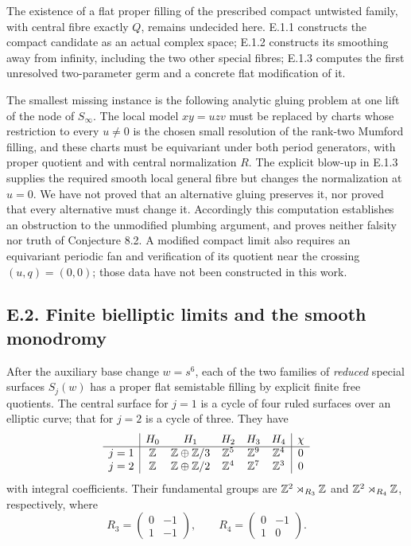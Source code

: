 \begin{problem}\label{st:E.1.5}
The existence of a flat proper filling of the prescribed compact
untwisted family, with central fibre exactly $Q$, remains undecided
here. E.1.1 constructs the compact candidate as an actual complex
space; E.1.2 constructs its smoothing away from infinity, including
the two other special fibres; E.1.3 computes the first unresolved
two-parameter germ and a concrete flat modification of it.

The smallest missing instance is the following analytic gluing
problem at one lift of the node of $S_\infty$. The local model
$xy=uzv$ must be replaced by charts whose restriction to every
$u\ne0$ is the chosen small resolution of the rank-two Mumford
filling, and these charts must be equivariant under both period
generators, with proper quotient and with central normalization $R$.
The explicit blow-up in E.1.3 supplies the required smooth local
general fibre but changes the normalization at $u=0$. We have not
proved that an alternative gluing preserves it, nor proved that every
alternative must change it. Accordingly this computation establishes
an obstruction to the unmodified plumbing argument, and proves
neither falsity nor truth of Conjecture 8.2. A modified compact limit
also requires an equivariant periodic fan and verification of its
quotient near the crossing $(u,q)=(0,0)$; those data have not been
constructed in this work.
\end{problem}

\subsection{E.2. Finite bielliptic limits and the smooth monodromy}

\begin{proposition}[E.2.1; Proved]\label{st:E.2.1}
After the auxiliary base change $w=s^6$, each of the two families of
\emph{reduced} special surfaces $S_j(w)$ has a proper flat
semistable filling by explicit finite free quotients. The central
surface for $j=1$ is a cycle of four ruled surfaces over an elliptic
curve; that for $j=2$ is a cycle of three. They have
\[
\begin{array}{c|ccccc|c}
 &H_0&H_1&H_2&H_3&H_4&\chi\\\hline
 j=1&\mathbb Z&\mathbb Z\oplus\mathbb Z/3&\mathbb Z^5&\mathbb Z^9&\mathbb Z^4&0\\
 j=2&\mathbb Z&\mathbb Z\oplus\mathbb Z/2&\mathbb Z^4&\mathbb Z^7&\mathbb Z^3&0
\end{array}
\]
with integral coefficients. Their fundamental groups are
$\mathbb Z^2\rtimes_{R_3}\mathbb Z$ and $\mathbb Z^2\rtimes_{R_4}\mathbb Z$, respectively,
where
\[
 R_3=\begin{pmatrix}0&-1\\1&-1\end{pmatrix},\qquad
 R_4=\begin{pmatrix}0&-1\\1&0\end{pmatrix}.
\]
\end{proposition}

